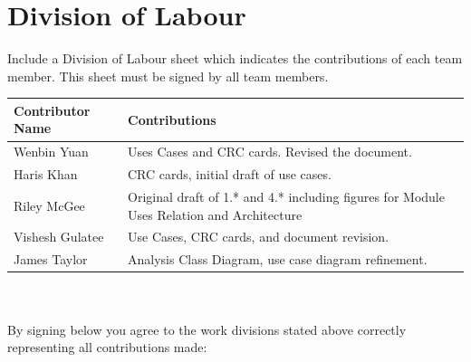 \documentclass[]{article}
\begin{document}
\appendix
\section{Division of Labour}
\label{sec:division_of_labour}
Include a Division of Labour sheet which indicates the contributions of each team member. This sheet must be signed by all team members.

\begin{tabular}{ | l | l | }
\hline
	\textbf{Contributor Name} & \textbf{Contributions}  \\
  	\hline
  	Wenbin Yuan & Uses Cases and CRC cards. Revised the document. \\
  	\hline
  	Haris Khan &  CRC cards, initial draft of use cases. \\
  	\hline
  	Riley McGee & Original draft of 1.* and 4.* including figures for Module Uses Relation and Architecture\\
  	\hline
		Vishesh Gulatee & Use Cases, CRC cards, and document revision. \\
  	\hline
  	James Taylor & Analysis Class Diagram, use case diagram refinement. \\
  	\hline
\end{tabular}
\\
\\
By signing below you agree to the work divisions stated above correctly representing all contributions made:



\newpage
\end{document}
